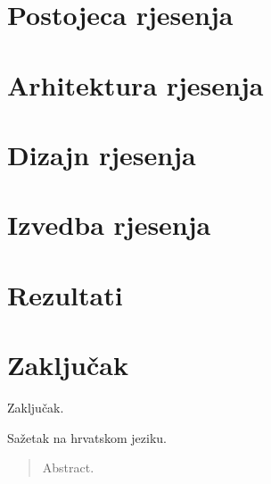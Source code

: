 \documentclass[times, utf8, diplomski, numeric]{fer}
\begin{document}
\chapter{Postojeca rjesenja}

\chapter{Arhitektura rjesenja}

\chapter{Dizajn rjesenja}

\chapter{Izvedba rjesenja}

\chapter{Rezultati}

\chapter{Zaključak}
Zaključak.




\begin{sazetak}
Sažetak na hrvatskom jeziku.

\end{sazetak}

\begin{abstract}
Abstract.

\end{abstract}
\end{document}
